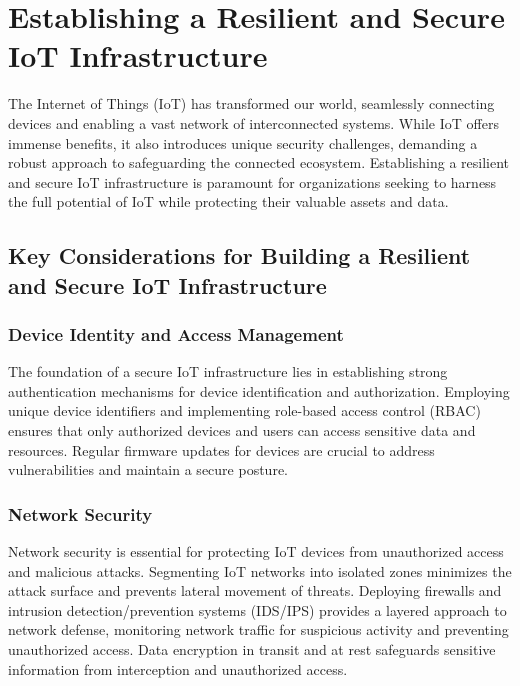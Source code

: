 \documentclass[conference]{IEEEtran}
\begin{document}
\section{Establishing a Resilient and Secure IoT Infrastructure}

\label{sec:iot-security}

The Internet of Things (IoT) has transformed our world, seamlessly connecting devices and enabling a vast network of interconnected systems. While IoT offers immense benefits, it also introduces unique security challenges, demanding a robust approach to safeguarding the connected ecosystem. Establishing a resilient and secure IoT infrastructure is paramount for organizations seeking to harness the full potential of IoT while protecting their valuable assets and data.

\subsection{Key Considerations for Building a Resilient and Secure IoT Infrastructure}

\subsubsection{Device Identity and Access Management}

The foundation of a secure IoT infrastructure lies in establishing strong authentication mechanisms for device identification and authorization. Employing unique device identifiers and implementing role-based access control (RBAC) ensures that only authorized devices and users can access sensitive data and resources. Regular firmware updates for devices are crucial to address vulnerabilities and maintain a secure posture.

\subsubsection{Network Security}

Network security is essential for protecting IoT devices from unauthorized access and malicious attacks. Segmenting IoT networks into isolated zones minimizes the attack surface and prevents lateral movement of threats. Deploying firewalls and intrusion detection/prevention systems (IDS/IPS) provides a layered approach to network defense, monitoring network traffic for suspicious activity and preventing unauthorized access. Data encryption in transit and at rest safeguards sensitive information from interception and unauthorized access.
\end{document}
